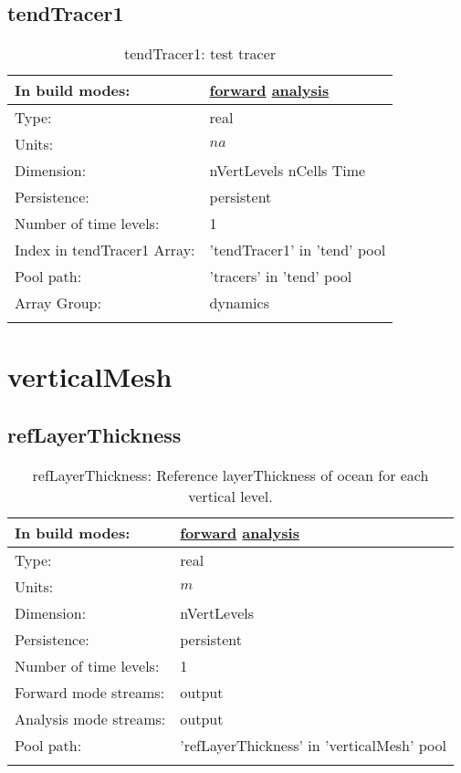 \subsection[tendTracer1]{tendTracer1}
\label{subsec:var_sec_tend_tendTracer1}
\begin{center}
\begin{longtable}{| p{2.0in} | p{4.0in} |}
        \hline 
        In build modes: & \hyperref[subsec:forward_var_tab_tend]{forward} \hyperref[subsec:analysis_var_tab_tend]{analysis} \\
        \hline 
        Type: & real \\
        \hline 
        Units: & $na$ \\
        \hline 
        Dimension: & nVertLevels nCells Time \\
        \hline 
        Persistence: & persistent \\
        \hline 
        Number of time levels: & 1 \\
        \hline 
		 Index in tendTracer1 Array: & 'tendTracer1' in 'tend' pool \\
		 \hline 
            Pool path: & 'tracers' in 'tend' pool
 \\
		 \hline 
		 Array Group: & dynamics \\
		 \hline 
    \caption{tendTracer1: test tracer}
\end{longtable}
\end{center}
\section[verticalMesh]{verticalMesh}
\label{sec:var_sec_verticalMesh}
\subsection[refLayerThickness]{refLayerThickness}
\label{subsec:var_sec_verticalMesh_refLayerThickness}
\begin{center}
\begin{longtable}{| p{2.0in} | p{4.0in} |}
        \hline 
        In build modes: & \hyperref[subsec:forward_var_tab_verticalMesh]{forward} \hyperref[subsec:analysis_var_tab_verticalMesh]{analysis} \\
        \hline 
        Type: & real \\
        \hline 
        Units: & $m$ \\
        \hline 
        Dimension: & nVertLevels \\
        \hline 
        Persistence: & persistent \\
        \hline 
        Number of time levels: & 1 \\
        \hline 
		 Forward mode streams: &  output \\
        \hline 
		 Analysis mode streams: &  output \\
        \hline 
            Pool path: & 'refLayerThickness' in 'verticalMesh' pool
 \\
		 \hline 
    \caption{refLayerThickness: Reference layerThickness of ocean for each vertical level.}
\end{longtable}
\end{center}
